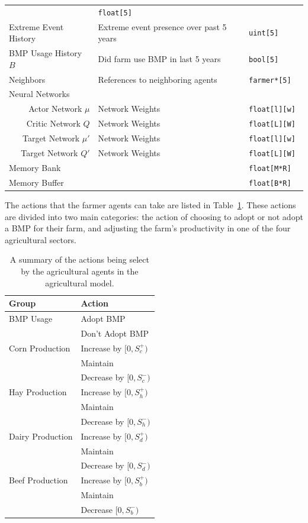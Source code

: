 \begin{longtable}{lll}
& \tt{float[5]} \\
Extreme Event History & Extreme event presence over past 5 years & \tt{uint[5]} \\
BMP Usage History $B$& Did farm use BMP in last 5 years & \tt{bool[5]} \\
Neighbors & References to neighboring agents & \tt{farmer*[5]} \\
Neural Networks && \\
\multicolumn{1}{r}{Actor Network $\mu$} & Network Weights & \tt{float[l][w]} \\
\multicolumn{1}{r}{Critic Network $Q$} & Network Weights & \tt{float[L][W]} \\
\multicolumn{1}{r}{Target Network $\mu'$} & Network Weights & \tt{float[l][w]} \\
\multicolumn{1}{r}{Target Network $Q'$} & Network Weights & \tt{float[L][W]} \\
Memory Bank && \tt{float[M*R]} \\
Memory Buffer && \tt{float[B*R]} \\
\end{longtable}

The actions that the farmer agents can take are listed in
Table~\ref{tab:farm_action_farm}.
These actions are divided into two main categories:
the action of choosing to adopt or not adopt a BMP for their farm,
and adjusting the farm's productivity in one of the four agricultural
sectors.

\begin{longtable}{p{}p{}}
\caption{A summary of the actions being select by the agricultural
agents in the agricultural model.}
\label{tab:farm_action_farm} \\ \hline \hline
Group & Action \\ \hline
\endfirsthead
\hline\endfoot
\hline\endlastfoot
BMP Usage & Adopt BMP  \\
    & Don't Adopt BMP  \\
Corn Production & Increase by $[0, S^+_c)$  \\
    & Maintain  \\
    & Decrease by $[0, S^-_c)$  \\
Hay Production & Increase by $[0, S^+_h)$  \\
    & Maintain \\
    & Decrease by $[0, S^-_h)$  \\
Dairy Production & Increase by $[0, S^+_d)$  \\
    & Maintain  \\
    & Decrease by $[0, S^-_d)$  \\
Beef Production & Increase by $[0, S^+_b)$  \\
    & Maintain  \\
    & Decrease $[0, S^-_b)$  \\
\end{longtable}

